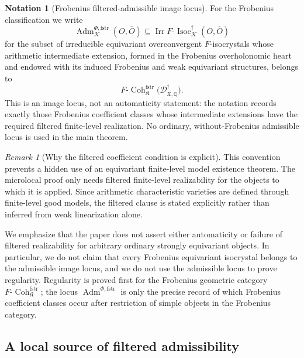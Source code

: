 \documentclass[11pt]{amsart}
\theoremstyle{plain}
\theoremstyle{definition}
\newtheorem{notation}{Notation}[section]
\theoremstyle{remark}
\newtheorem{remark}{Remark}[section]
\newcommand{\Coh}{\operatorname{Coh}}
\newcommand{\Irr}{\operatorname{Irr}}
\newcommand{\Isoc}{\operatorname{Isoc}}
\newcommand{\fstr}{\mathrm{fstr}}
\newcommand{\Adm}{\operatorname{Adm}}
\begin{document}
\begin{notation}[Frobenius filtered-admissible image locus]
\label{def:filtered-admissible-isocrystal}
\label{def:F-filtered-admissible-isocrystal}
For the Frobenius classification we write
\[
  \Adm^{\Phi,\fstr}_{\mathcal K}(O,\overline O)
  \subseteq
  \Irr F\text{-}\Isoc^{\dagger}_{\mathcal K}(O,\overline O)
\]
for the subset of irreducible equivariant overconvergent \(F\)-isocrystals
whose arithmetic intermediate extension, formed in the Frobenius overholonomic
heart and endowed with its induced Frobenius and weak equivariant structures,
belongs to
\[
  F\text{-}\Coh^{\fstr}_{\mathfrak K}
  \bigl(\mathscr D^\dagger_{\mathfrak X,\mathbb Q}\bigr).
\]
This is an image locus, not an automaticity statement: the notation records
exactly those Frobenius coefficient classes whose intermediate extensions have
the required filtered finite-level realization.  No ordinary, without-Frobenius
admissible locus is used in the main theorem.
\end{notation}

\begin{remark}[Why the filtered coefficient condition is explicit]
\label{rem:filtered-coefficient-condition}
This convention prevents a hidden use of an equivariant finite-level model
existence theorem.  The microlocal proof only needs filtered finite-level
realizability for the objects to which it is applied.  Since arithmetic
characteristic varieties are defined through finite-level good models, the
filtered clause is stated explicitly rather than inferred from weak
linearization alone.


We emphasize that the paper does not assert either automaticity or failure of
filtered realizability for arbitrary ordinary strongly equivariant objects.  In
particular, we do not claim that every Frobenius equivariant isocrystal belongs
to the admissible image locus, and we do not use the admissible locus to prove
regularity.  Regularity is proved first for the Frobenius geometric category
\(F\text{-}\Coh^{\fstr}_{\mathfrak K}\); the locus \(\Adm^{\Phi,\fstr}\) is only the precise
record of which Frobenius coefficient classes occur after restriction of simple
objects in the Frobenius category.
\end{remark}

\subsection{A local source of filtered admissibility}
\label{subsec:local-filtered-admissibility}
\end{document}
